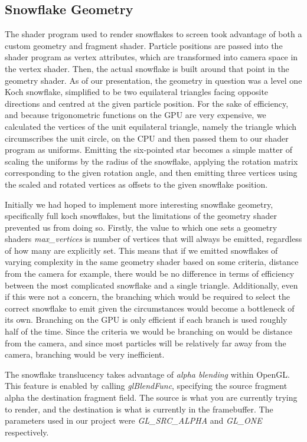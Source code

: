 \documentclass[conference]{acmsiggraph}
\begin{document}
\subsection{Snowflake Geometry}
The shader program used to render snowflakes to screen took advantage of both a custom geometry and fragment shader. Particle positions are passed into the shader program as vertex attributes, which are transformed into camera space in the vertex shader. Then, the actual snowflake is built around that point in the geometry shader. As of our presentation, the geometry in question was a level one Koch snowflake, simplified to be two equilateral triangles facing opposite directions and centred at the given particle position. For the sake of efficiency, and because trigonometric functions on the GPU are very expensive, we calculated the vertices of the unit equilateral triangle, namely the triangle which circumscribes the unit circle, on the CPU and then passed them to our shader program as uniforms. Emitting the six-pointed star becomes a simple matter of scaling the uniforms by the radius of the snowflake, applying the rotation matrix corresponding to the given rotation angle, and then emitting three vertices using the scaled and rotated vertices as offsets to the given snowflake position.

Initially we had hoped to implement more interesting snowflake geometry, specifically full koch snowflakes, but the limitations of the geometry shader prevented us from doing so. Firstly, the value to which one sets a geometry shaders \textit{max\_vertices} is number of vertices that will always be emitted, regardless of how many are explicitly set. This means that if we emitted snowflakes of varying complexity in the same geometry shader based on some criteria, distance from the camera for example, there would be no difference in terms of efficiency between the most complicated snowflake and a single triangle. Additionally, even if this were not a concern, the branching which would be required to select the correct snowflake to emit given the circumstances would become a bottleneck of its own. Branching on the GPU is only efficient if each branch is used roughly half of the time. Since the criteria we would be branching on would be distance from the camera, and since most particles will be relatively far away from the camera, branching would be very inefficient.

The snowflake translucency takes advantage of \textit{alpha blending} within OpenGL. This feature is enabled by calling \textit{glBlendFunc}, specifying the source fragment alpha the destination fragment field. The source is what you are currently trying to render, and the destination is what is currently in the framebuffer. The parameters used in our project were \textit{GL\_SRC\_ALPHA}  and \textit{GL\_ONE} respectively.
\end{document}
